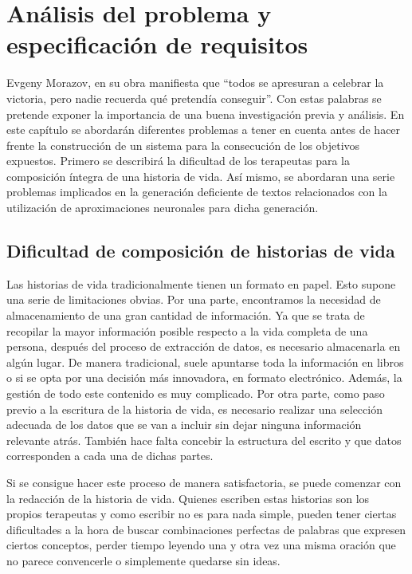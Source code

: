 \chapter{Análisis del problema y especificación de requisitos}
\label{cap:analisisYRequisitos}

Evgeny Morazov, en su obra \citep{morozov2015la} manifiesta que ``todos se apresuran a  celebrar la victoria, pero nadie recuerda qué pretendía conseguir''. Con estas palabras se pretende exponer la importancia de una buena investigación previa y análisis. En este capítulo se abordarán diferentes problemas a tener en cuenta antes de hacer frente la construcción de un sistema para la consecución de los objetivos expuestos. Primero se describirá la dificultad de los terapeutas para la composición íntegra de una historia de vida. Así mismo, se abordaran una serie problemas implicados en la generación deficiente de textos relacionados con la utilización de aproximaciones neuronales para dicha generación.



\section{Dificultad de composición de historias de vida}


Las historias de vida tradicionalmente tienen un formato en papel. Esto supone una serie de limitaciones obvias. Por una parte, encontramos la necesidad de almacenamiento de una gran cantidad de información. Ya que se trata de recopilar la mayor información posible respecto a la vida completa de una persona, después del proceso de extracción de datos, es necesario almacenarla en algún lugar. De manera tradicional, suele apuntarse toda la información en libros o si se opta por una decisión más innovadora, en formato electrónico. Además, la gestión de todo este contenido es muy complicado. 
Por otra parte, como paso previo a la escritura de la historia de vida, es necesario realizar una selección adecuada de los datos que se van a incluir sin dejar ninguna información relevante atrás. También hace falta concebir la estructura del escrito y que datos corresponden a cada una de dichas partes.

Si se consigue hacer este proceso de manera satisfactoria, se puede comenzar con la redacción de la historia de vida. Quienes escriben estas historias son los propios terapeutas y como escribir no es para nada simple, pueden tener ciertas dificultades a la hora de buscar combinaciones perfectas de palabras que expresen ciertos conceptos, perder tiempo leyendo una y otra vez una misma oración que no parece convencerle o simplemente quedarse sin ideas.

